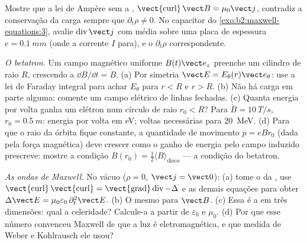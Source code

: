 \begin{exercise}[$\star\star$]\label{exo:b2:maxwell-equations:9}
Mostre que a lei de Ampère sem a , $\operatorname{\vect{curl}}
\vect B = \mu_0\vect j$, contradiz a conservação da carga sempre que $\partial_t\rho
\ne 0$. No capacitor do \cref{exo:b2:maxwell-equations:3}, avalie
$\operatorname{div}\vect j$ com média sobre uma placa de espessura $e = \qty{0.1}{mm}$
(onde a corrente $I$ para), e o $\partial_t\rho$ correspondente.
\end{exercise}

\begin{exercise}[$\star\star\star$]\label{exo:b2:maxwell-equations:10}
\emph{O betatron.} Um campo magnético uniforme $B(t)\vect e_z$ preenche um
cilindro de raio $R$, crescendo a $\dd B/\dd t = \dot B$. (a) Por simetria
$\vect E = E_\theta(r)\vect e_\theta$: use a lei de Faraday integral para achar $E_\theta$
para $r < R$ e $r > R$. (b) Não há carga em parte alguma: comente um
campo elétrico de linhas fechadas. (c) Quanta energia por volta ganha um elétron
num círculo de raio $r_0 < R$? Para $\dot B = \qty{10}{T/s}$,
$r_0 = \qty{0.5}{m}$: energia por volta em eV; voltas necessárias para \qty{20}{MeV}.
(d) Para que o raio da órbita fique constante, a quantidade de movimento $p = eBr_0$ (dada
pela força magnética) deve crescer como o ganho de energia pelo campo induzido
prescreve: mostre a condição $B(r_0) = \tfrac12\langle B\rangle_{\text{disco}}$
--- a condição do betatron.
\end{exercise}

\begin{exercise}[$\star\star\star$]\label{exo:b2:maxwell-equations:11}
\emph{As ondas de Maxwell.} No vácuo ($\rho = 0$, $\vect j = \vect 0$): (a) tome
o  da , use $\operatorname{\vect{curl}}
\operatorname{\vect{curl}} = \operatorname{\vect{grad}}\operatorname{div} - \Delta$ e as demais
equações para obter $\Delta\vect E = \mu_0\varepsilon_0\,\partial_t^2\vect E$. (b) O mesmo para
$\vect B$. (c) Essa é a  em três dimensões: qual a celeridade?
Calcule-a a partir de $\varepsilon_0$ e $\mu_0$. (d) Por que esse número convenceu
Maxwell de que a luz é eletromagnética, e que medida de
Weber e Kohlrausch ele usou?
\end{exercise}

